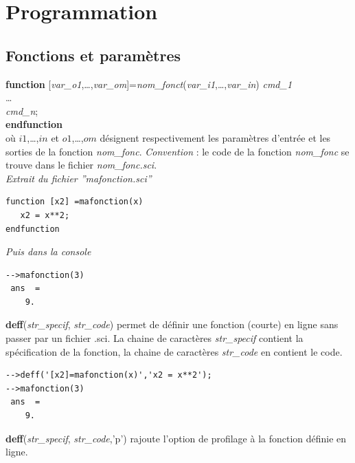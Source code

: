 \documentclass{article}
\begin{document}
\begin{multicols}{3}
\begin{description}
\end{description}


\section*{Programmation}
\subsection*{Fonctions et paramètres}
\begin{description}
\item{\textbf{function} [\textit{var\_o1},\ldots,\textit{var\_om}]=\textit{nom\_fonct}(\textit{var\_i1},\ldots,\textit{var\_in})}
	 \textit{cmd\_1}\\ \ldots\\\textit{cmd\_n};\\
\hspace*{-7mm}\textbf{endfunction}\\
où $i1$,\ldots,$in$  et $o1$,\ldots,$om$ désignent respectivement les paramètres d'entrée et les sorties de la fonction \textit{nom\_fonc}. \emph{Convention} : le code de la fonction \textit{nom\_fonc} se trouve dans le fichier \textit{nom\_fonc.sci}.\\

\emph{Extrait du fichier ''mafonction.sci''}
\begin{verbatim}
function [x2] =mafonction(x)
   x2 = x**2;
endfunction
\end{verbatim}
\vspace{3mm}
\emph{Puis dans la console}
\begin{verbatim}
-->mafonction(3)
 ans  =
    9.
\end{verbatim}

\item{\textbf{deff}(\textit{str\_specif}, \textit{str\_code})} permet de définir une fonction (courte) en ligne sans passer par un fichier .sci. La chaine de caractères \textit{str\_specif} contient la spécification de la fonction, la chaine de caractères \textit{str\_code} en contient le code.
\begin{verbatim}
-->deff('[x2]=mafonction(x)','x2 = x**2');
-->mafonction(3)
 ans  =
    9.
\end{verbatim}
\item{\textbf{deff}(\textit{str\_specif}, \textit{str\_code},'p')} rajoute l'option de profilage à la fonction définie en ligne.
\end{description}


\end{multicols}
\end{document}

